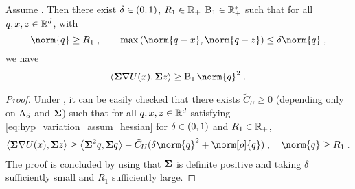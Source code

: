 \begin{lemma}
\label{lem:variation_assum_hessian_pertub}
Assume .
Then there exist $\delta \in \left(0,1\right)$, $R_1 \in \mathbb{R}_+$ $\operatorname{B}_1 \in \mathbb{R}_+^*$ such that for all $q,x,z \in \mathbb{R}^d$, with
\begin{equation}
\label{eq:hyp_variation_assum_hessian_pertub}
\norm{q} \geq R_1 \eqsp, \qquad  \max\parenthese{\norm{\q-\x},\norm{\q-z}} \leq \delta \norm{\q}  \eqsp,
\end{equation}
we have
\begin{equation}
  \ps{\Sigmabf \nabla \F(\x)}{\Sigmabf z} \geq \BB_1 \norm{\q}^{2}  \eqsp.
\end{equation}
\end{lemma}
\begin{proof}
Under ,  it can be easily checked that there
exists $\tilde{C}_U \geq 0$ (depending only on $\operatorname{A}_5$ and $\boldsymbol{\Sigma}$) such that for all  $q,x,z \in \mathbb{R}^d$ satisfying  \eqref{eq:hyp_variation_assum_hessian} for $\delta \in \left(0,1\right)$ and $R_1 \in \mathbb{R}_+$,
\begin{equation}
 \ps{\Sigmabf \nabla \F(\x)}{\Sigmabf  z}  \geq \ps{\Sigmabf^2 q}{\Sigmabf q} - \tilde{C}_U  (\delta \norm{\q}^{2} + \norm[\rho]{\q})\eqsp, \quad \norm{q} \geq R_1 \eqsp.
\end{equation}
The proof is concluded by using that $\boldsymbol{\Sigma}$ is definite positive and  taking $\delta$ sufficiently small and $R_1$ sufficiently large.
\end{proof}

